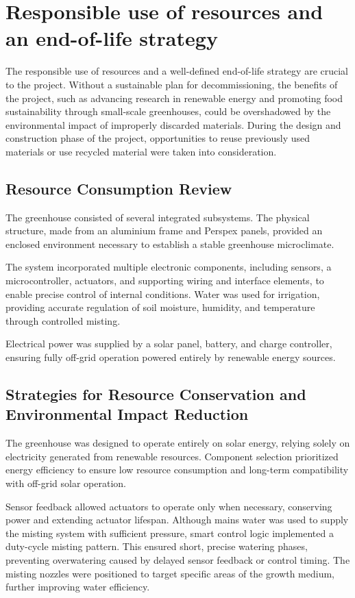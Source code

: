 \chapter{Responsible use of resources and an end-of-life strategy } 

The responsible use of resources and a well-defined end-of-life strategy are crucial to the project. Without a sustainable plan for decommissioning, the benefits of the project, such as advancing research in renewable energy and promoting food sustainability through small-scale greenhouses, could be overshadowed by the environmental impact of improperly discarded materials. 
During the design and construction phase of the project, opportunities to reuse previously used materials or use recycled material were taken into consideration.


\section{Resource Consumption Review}

The greenhouse consisted of several integrated subsystems. The physical structure, made from an aluminium frame and Perspex panels, provided an enclosed environment necessary to establish a stable greenhouse microclimate.

The system incorporated multiple electronic components, including sensors, a microcontroller, actuators, and supporting wiring and interface elements, to enable precise control of internal conditions. Water was used for irrigation, providing accurate regulation of soil moisture, humidity, and temperature through controlled misting.

Electrical power was supplied by a solar panel, battery, and charge controller, ensuring fully off-grid operation powered entirely by renewable energy sources.

\section{Strategies for Resource Conservation and Environmental Impact Reduction}

The greenhouse was designed to operate entirely on solar energy, relying solely on electricity generated from renewable resources. Component selection prioritized energy efficiency to ensure low resource consumption and long-term compatibility with off-grid solar operation.

Sensor feedback allowed actuators to operate only when necessary, conserving power and extending actuator lifespan. Although mains water was used to supply the misting system with sufficient pressure, smart control logic implemented a duty-cycle misting pattern. This ensured short, precise watering phases, preventing overwatering caused by delayed sensor feedback or control timing. The misting nozzles were positioned to target specific areas of the growth medium, further improving water efficiency.

